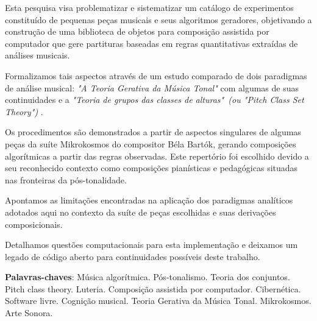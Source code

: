 \documentclass[
	12pt,				%
	openright,			%
	twoside,			%
	a4paper,			%
	english,			%
	french,				%
	spanish,			%
	brazil				%
	]{abntex2}
\begin{document}
\begin{resumo}


Esta pesquisa visa problematizar e sistematizar um catálogo de experimentos constituído de pequenas peças musicais e seus algoritmos geradores, objetivando a construção de uma biblioteca de objetos para composição assistida por computador que gere partituras baseadas em regras quantitativas extraídas de análises musicais.

Formalizamos tais aspectos através de um estudo comparado de dois paradigmas de análise musical: \textit{"A Teoria Gerativa da Música Tonal"}\cite{lerdahl1983generative} com algumas de suas continuidades  \cite{lerdahl2009genesis,temperley2001cognition} e a \textit{"Teoria de grupos das classes de alturas"\ (ou "Pitch Class Set Theory")}  \cite{forte1973structure,straus2004}.

Os procedimentos são demonstrados a partir de aspectos singulares de algumas peças da suíte Mikrokosmos do compositor Béla Bartók, gerando composições algorítmicas a partir das regras observadas. Este repertório foi escolhido devido a seu reconhecido contexto como composições pianísticas e pedagógicas situadas nas fronteiras da pós-tonalidade. 

Apontamos as limitações encontradas na aplicação dos paradigmas analíticos adotados aqui no contexto da suíte de peças escolhidas e suas derivações composicionais.

Detalhamos questões computacionais para esta implementação e deixamos um legado de código aberto para continuidades possíveis deste trabalho.


 \textbf{Palavras-chaves}: Música algorítmica. Pós-tonalismo. Teoria dos conjuntos. Pitch class theory. Luteria. Composição assistida por computador. Cibernética. Software livre. Cognição musical. Teoria Gerativa da Música Tonal. Mikrokosmos. Arte Sonora.
\end{resumo}
\end{document}
